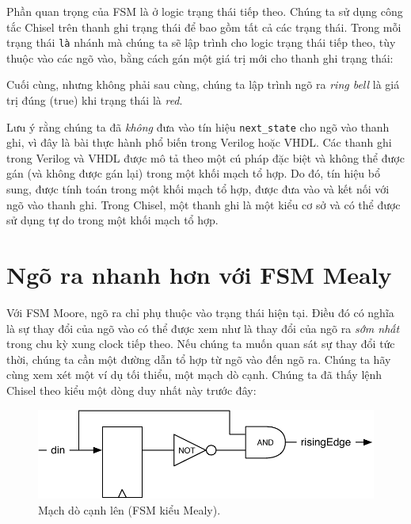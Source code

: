 \documentclass[%
    10pt,
    headinclude, footexclude,
    openright, %
    notitlepage,
    cleardoubleempty,
    headsepline,
    pointlessnumbers,
    bibtotoc, idxtotoc,
    ]{scrbook}
\newcommand{\code}[1]{{\small{\texttt{#1}}}}
\newcommand{\scale}{0.7}
\begin{document}

\noindent Phần quan trọng của FSM là ở logic trạng thái tiếp theo. Chúng ta sử dụng công tắc Chisel trên thanh ghi trạng thái để bao gồm tất cả các trạng thái. Trong mỗi trạng thái \code{là} nhánh mà chúng ta sẽ lập trình cho logic trạng thái tiếp theo, tùy thuộc vào các ngõ vào, bằng cách gán một giá trị mới cho thanh ghi trạng thái: 


\noindent Cuối cùng, nhưng không phải sau cùng, chúng ta lập trình ngõ ra \emph{ring bell} là giá trị đúng (true) khi trạng thái là \emph{red}.


Lưu ý rằng chúng ta đã \emph{không} đưa vào tín hiệu \code{next\_state} cho ngõ vào thanh ghi, vì đây là bài thực hành phổ biến trong Verilog hoặc VHDL. Các thanh ghi trong Verilog và VHDL được mô tả theo một cú pháp đặc biệt và không thể được gán (và không được gán lại) trong một khối mạch tổ hợp. Do đó, tín hiệu bổ sung, được tính toán trong một khối mạch tổ hợp, được đưa vào và kết nối với ngõ vào thanh ghi. Trong Chisel, một thanh ghi là một kiểu cơ sở và có thể được sử dụng tự do trong một khối mạch tổ hợp. 

\section{Ngõ ra nhanh hơn với FSM Mealy}

Với FSM Moore, ngõ ra chỉ phụ thuộc vào trạng thái hiện tại. Điều đó có nghĩa là sự thay đổi của ngõ vào có thể được xem như là thay đổi của ngõ ra \emph{sớm nhất} trong chu kỳ xung clock tiếp theo. Nếu chúng ta muốn quan sát sự thay đổi tức thời, chúng ta cần một đường dẫn tổ hợp từ ngõ vào đến ngõ ra. Chúng ta hãy cùng xem xét một ví dụ tối thiểu, một mạch dò cạnh. Chúng ta đã thấy lệnh Chisel theo kiểu một dòng duy nhất này trước đây:


\begin{figure}
  \centering
  \includegraphics[scale=\scale]{figures/fsm-rising}
  \caption{Mạch dò cạnh lên (FSM kiểu Mealy).}
  \label{fig:fsm-rising}
\end{figure}
\end{document}
